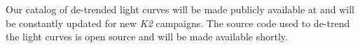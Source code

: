 \documentclass[]{emulateapj}
\newcommand{\note}[1]{{\color{red} #1}}
\begin{document}
%
%
%
Our catalog of de-trended light curves will be made publicly available at and will be constantly
updated for new \emph{K2} campaigns. The source code used to de-trend the light curves
is open source and will be made available shortly.
%
%



\end{document}
